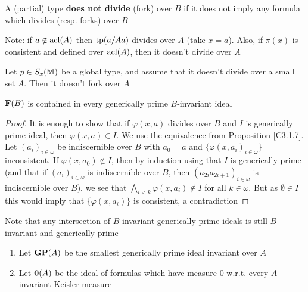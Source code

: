 \documentclass[11pt]{article}
\DeclareMathOperator{\GP}{\tf{GP}}
\begin{document}
\begin{definition}[]
A (partial) type \textbf{does not divide} (fork) over \(B\) if it does not imply any formula which
divides (resp. forks) over \(B\)
\end{definition}

Note: if \(a\notin\operatorname{acl}(A)\) then \(\operatorname{tp}(a/Aa)\) divides over \(A\) (take \(x=a\)). Also, if \(\pi(x)\) is consistent
and defined over \(\operatorname{acl}(A)\), then it doesn't divide over \(A\)

\begin{exercise}
Let \(p\in S_x(\mathbb{M})\) be a global type, and assume that it doesn't divide over a small set \(A\).
Then it doesn't fork over \(A\)
\end{exercise}

\begin{proposition}[]
\label{C3.2.6}
\(\operatorname{\textbf{F}}(B)\) is contained in every generically prime \(B\)-invariant ideal
\end{proposition}

\begin{proof}
It is enough to show that if \(\varphi(x,a)\) divides over \(B\) and \(I\) is generically prime ideal,
then \(\varphi(x,a)\in I\). We use the equivalence from Proposition \ref{C3.1.7}. Let \((a_i)_{i\in\omega}\) be
indiscernible over \(B\) with \(a_0=a\) and \(\{\varphi(x,a_i)_{i\in\omega}\}\) inconsistent.
If \(\varphi(x,a_0)\notin I\), then by induction using that \(I\) is generically prime (and that
if \((a_i)_{i\in\omega}\) is indiscernible over \(B\), then \((a_{2i}a_{2i+1})_{i\in\omega}\) is indiscernible
over \(B\)), we see that \(\bigwedge_{i<k}\varphi(x,a_i)\notin I\) for all \(k\in\omega\). But as \(\emptyset\in I\) this would imply
that \(\{\varphi(x,a_i)\}\) is consistent, a contradiction
\end{proof}

Note that any intersection of \(B\)-invariant generically prime ideals is still \(B\)-invariant
and generically prime

\begin{definition}[]
\begin{enumerate}
\item Let \(\GP(A)\) be the smallest generically prime ideal invariant over \(A\)
\item Let \(\mathbf{0}(A)\) be the ideal of formulas which have measure 0 w.r.t. every \(A\)-invariant
Keisler measure
\end{enumerate}
\end{definition}
\end{document}
